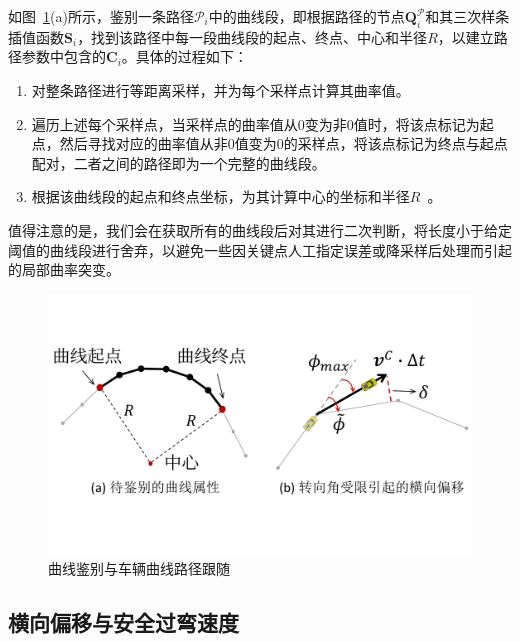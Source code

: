 如图~\ref{fig:traedits_curveillustration}(a)所示，鉴别一条路径$\mathscr{P}_i$中的曲线段，即根据路径的节点$\textbf{Q}^{\mathscr{P}}_{i}$和其三次样条插值函数$\textbf{S}_{i}$，找到该路径中每一段曲线段的起点、终点、中心和半径$R$，以建立路径参数中包含的$\textbf{C}_{i}$。具体的过程如下：

\begin{enumerate}
    \item 对整条路径进行等距离采样，并为每个采样点计算其曲率值。

    \item 遍历上述每个采样点，当采样点的曲率值从0变为非0值时，将该点标记为起点，然后寻找对应的曲率值从非0值变为0的采样点，将该点标记为终点与起点配对，二者之间的路径即为一个完整的曲线段。

    \item 根据该曲线段的起点和终点坐标，为其计算中心的坐标和半径$R$~\cite{li2012automated}。
\end{enumerate}

值得注意的是，我们会在获取所有的曲线段后对其进行二次判断，将长度小于给定阈值的曲线段进行舍弃，以避免一些因关键点人工指定误差或降采样后处理而引起的局部曲率突变。

\begin{figure}[t]
\centering
\includegraphics[width=0.7\columnwidth]{figure/traedits/curve combine 4_cn_v2.pdf}
\caption[曲线鉴别与车辆曲线路径跟随]{
曲线鉴别与车辆曲线路径跟随
}
\label{fig:traedits_curveillustration}
\end{figure}

\subsection{横向偏移与安全过弯速度}
\label{section:traedits_physics}

